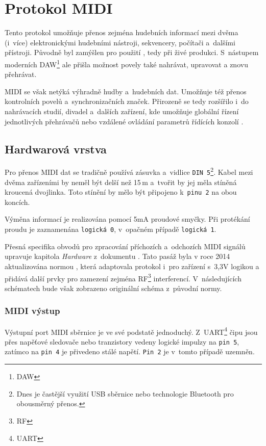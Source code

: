 \chapter{Protokol MIDI}\label{chpt:MIDI}

Tento protokol umožňuje přenos zejména hudebních informací mezi dvěma (i~více) elektronickými hudebními nástroji, sekvencery, počítači a~dalšími přístroji. Původně byl zamýšlen pro použití , tedy při živé produkci. \cite{MIDIspecs} S~nástupem moderních \acs{DAW}\footnote{\acl{DAW}} ale přišla možnost povely také nahrávat, upravovat a znovu přehrávat. 

\acs{MIDI} se však netýká výhradně hudby a~hudebních dat. Umožňuje též přenos kontrolních povelů a~synchronizačních značek. Přirozeně se tedy rozšířilo i~do nahrávacích studií, divadel a~dalších zařízení, kde umožňuje globální řízení jednotlivých přehrávačů nebo vzdálené ovládání parametrů řídících konzolí \cite{vkMIDI}.

\section{Hardwarová vrstva}
Pro přenos \acs{MIDI} dat se tradičně používá zásuvka a~vidlice \texttt{DIN~5}\footnote{Dnes je častější využití USB sběrnice nebo technologie Bluetooth pro obousměrný přenos.}.  Kabel mezi dvěma zařízeními by neměl být delší než 15\,\unit{m} a~tvořit by jej měla stíněná kroucená dvojlinka. Toto stínění by mělo být připojeno k~\texttt{pinu~2} na obou koncích. 

Výměna informací je realizována pomocí 5\unit{mA} proudové smyčky. Při protékání proudu je zaznamenána \texttt{logická~0}, v~opačném případě \texttt{logická~1}. \cite{MIDIspecs}

Přesná specifika obvodů pro zpracování příchozích a~odchozích \acs{MIDI} signálů upravuje kapitola \emph{Hardware} z~dokumentu \cite{MIDIspecs}. Tato pasáž byla v roce 2014 aktualizována normou \cite{MIDIupd}, která adaptovala protokol i~pro zařízení s~3,3\unit{V} logikou a přidává další prvky pro zamezení zejména \acs{RF}\footnote{\acl{RF}} interferencí. V~následujících schématech bude však zobrazeno originální schéma z~původní normy.

\subsection{MIDI výstup}

Výstupní port \acs{MIDI} sběrnice je ve své podstatě jednoduchý. Z~\acs{UART}\footnote{\acl{UART}} čipu jsou přes napěťové sledovače nebo tranzistory vedeny logické impulzy na \texttt{pin~5}, zatímco na \texttt{pin~4} je přivedeno stálé napětí. \texttt{Pin~2} je v~tomto případě uzemněn. \cite{MIDIspecs}

